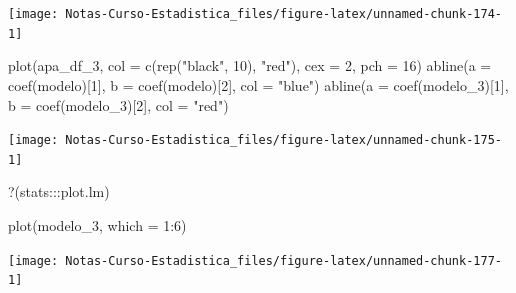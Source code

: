 \documentclass[
  12pt,
]{book}
\newenvironment{Shaded}{\begin{snugshade}}{\end{snugshade}}
\newcommand{\AttributeTok}[1]{\textcolor[rgb]{0.77,0.63,0.00}{#1}}
\newcommand{\DecValTok}[1]{\textcolor[rgb]{0.00,0.00,0.81}{#1}}
\newcommand{\FunctionTok}[1]{\textcolor[rgb]{0.00,0.00,0.00}{#1}}
\newcommand{\NormalTok}[1]{#1}
\newcommand{\SpecialCharTok}[1]{\textcolor[rgb]{0.00,0.00,0.00}{#1}}
\newcommand{\StringTok}[1]{\textcolor[rgb]{0.31,0.60,0.02}{#1}}
\begin{document}
\begin{center}\texttt{[image: Notas-Curso-Estadistica\_files/figure-latex/unnamed-chunk-174-1]} \end{center}

\begin{Shaded}
\begin{Highlighting}[]
\FunctionTok{plot}\NormalTok{(apa\_df\_3, }\AttributeTok{col =} \FunctionTok{c}\NormalTok{(}\FunctionTok{rep}\NormalTok{(}\StringTok{"black"}\NormalTok{, }\DecValTok{10}\NormalTok{), }\StringTok{"red"}\NormalTok{), }\AttributeTok{cex =} \DecValTok{2}\NormalTok{,}
    \AttributeTok{pch =} \DecValTok{16}\NormalTok{)}
\FunctionTok{abline}\NormalTok{(}\AttributeTok{a =} \FunctionTok{coef}\NormalTok{(modelo)[}\DecValTok{1}\NormalTok{], }\AttributeTok{b =} \FunctionTok{coef}\NormalTok{(modelo)[}\DecValTok{2}\NormalTok{], }\AttributeTok{col =} \StringTok{"blue"}\NormalTok{)}
\FunctionTok{abline}\NormalTok{(}\AttributeTok{a =} \FunctionTok{coef}\NormalTok{(modelo\_3)[}\DecValTok{1}\NormalTok{], }\AttributeTok{b =} \FunctionTok{coef}\NormalTok{(modelo\_3)[}\DecValTok{2}\NormalTok{],}
    \AttributeTok{col =} \StringTok{"red"}\NormalTok{)}
\end{Highlighting}
\end{Shaded}

\begin{center}\texttt{[image: Notas-Curso-Estadistica\_files/figure-latex/unnamed-chunk-175-1]} \end{center}

\begin{Shaded}
\begin{Highlighting}[]
\StringTok{\textasciigrave{}}\AttributeTok{?}\StringTok{\textasciigrave{}}\NormalTok{(stats}\SpecialCharTok{:::}\NormalTok{plot.lm)}
\end{Highlighting}
\end{Shaded}

\begin{Shaded}
\begin{Highlighting}[]
\FunctionTok{plot}\NormalTok{(modelo\_3, }\AttributeTok{which =} \DecValTok{1}\SpecialCharTok{:}\DecValTok{6}\NormalTok{)}
\end{Highlighting}
\end{Shaded}

\begin{center}\texttt{[image: Notas-Curso-Estadistica\_files/figure-latex/unnamed-chunk-177-1]} \end{center}
\end{document}
